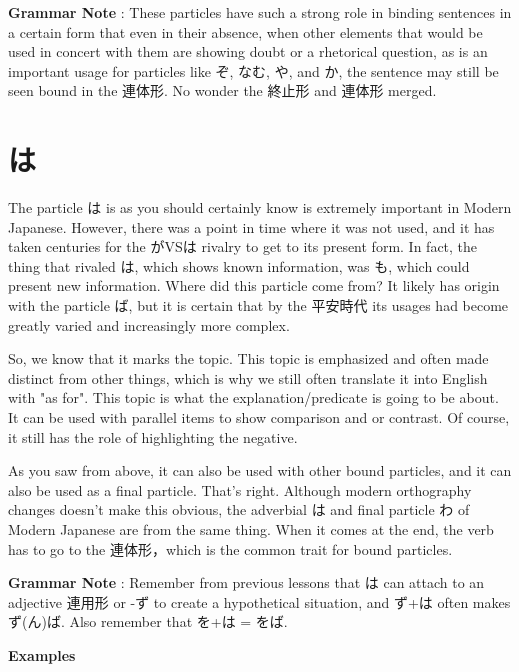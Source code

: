 \par{\textbf{Grammar Note }: These particles have such a strong role in binding sentences in a certain form that even in their absence, when other elements that would be used in concert with them are showing doubt or a rhetorical question, as is an important usage for particles like ぞ, なむ, や, and か, the sentence may still be seen bound in the 連体形. No wonder the 終止形 and 連体形 merged. }
      
\section{は}
 
\par{ The particle は is as you should certainly know is extremely important in Modern Japanese. However, there was a point in time where it was not used, and it has taken centuries for the がVSは rivalry to get to its present form. In fact, the thing that rivaled は, which shows known information, was も, which could present new information. Where did this particle come from? It likely has origin with the particle ば, but it is certain that by the 平安時代 its usages had become greatly varied and increasingly more complex. }

\par{ So, we know that it marks the topic. This topic is emphasized and often made distinct from other things, which is why we still often translate it into English with "as for". This topic is what the explanation\slash predicate is going to be about. It can be used with parallel items to show comparison and or contrast. Of course, it still has the role of highlighting the negative. }

\par{ As you saw from above, it can also be used with other bound particles, and it can also be used as a final particle. That's right. Although modern orthography changes doesn't make this obvious, the adverbial は and final particle わ of Modern Japanese are from the same thing. When it comes at the end, the verb has to go to the 連体形，which is the common trait for bound particles. }

\par{\textbf{Grammar Note }: Remember from previous lessons that は can attach to an adjective 連用形 or -ず to create a hypothetical situation, and ず+は often makes ず(ん)ば. Also remember that を+は = をば. }

\begin{center}
 \textbf{Examples }
\end{center}

